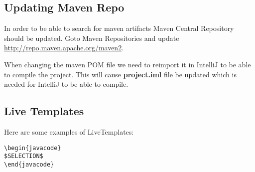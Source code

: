 \subsection {Updating Maven Repo}
In order to be able to search for maven artifacts Maven Central Repository should be updated. Goto Maven Repositories and update \href{http://repo.maven.apache.org/maven2}{http://repo.maven.apache.org/maven2}. 

When changing the maven POM file we need to reimport it in IntelliJ to be able to compile the project. This will cause \textbf{project.iml} file be updated which is needed for IntelliJ to be able to compile.

\subsection {Live Templates}

Here are some examples of LiveTemplates:

\begin{verbatim}
\begin{javacode}
$SELECTION$
\end{javacode}
\end{verbatim}
